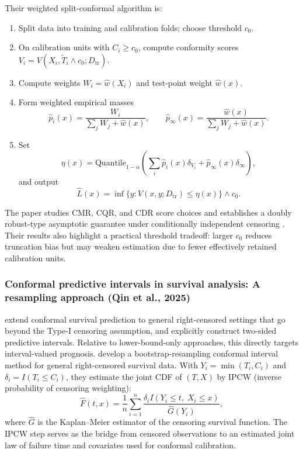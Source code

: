 \documentclass[12pt]{article}
\makeatletter
\let\thesis@subsection\subsubsection
\renewcommand{\subsection}{\thesis@subsection}
\makeatother
\begin{document}
Their weighted split-conformal algorithm is:
\begin{enumerate}
\item Split data into training and calibration folds; choose threshold $c_0$.
\item On calibration units with $C_i\ge c_0$, compute conformity scores $V_i=V(X_i,\widetilde T_i\wedge c_0;D_{\mathrm{tr}})$.
\item Compute weights $W_i=\widehat w(X_i)$ and test-point weight $\widehat w(x)$.
\item Form weighted empirical masses
\[
\widehat p_i(x)=\frac{W_i}{\sum_j W_j+\widehat w(x)},\qquad
\widehat p_\infty(x)=\frac{\widehat w(x)}{\sum_j W_j+\widehat w(x)}.
\]
\item Set
\[
\eta(x)=\mathrm{Quantile}_{1-\alpha}\!\left(\sum_i \widehat p_i(x)\delta_{V_i}+\widehat p_\infty(x)\delta_{\infty}\right),
\]
and output
\[
\widehat L(x)=\inf\{y:V(x,y;D_{\mathrm{tr}})\le \eta(x)\}\wedge c_0.
\]
\end{enumerate}
The paper studies CMR, CQR, and CDR score choices and establishes a doubly robust-type asymptotic guarantee under conditionally independent censoring \citep{candes2023conformalized}.
Their results also highlight a practical threshold tradeoff: larger $c_0$ reduces truncation bias but may weaken estimation due to fewer effectively retained calibration units.



\subsection{Conformal predictive intervals in survival analysis: A resampling approach (Qin et al., 2025)}
\citet{qin2025conformal} extend conformal survival prediction to general right-censored settings that go beyond the Type-I censoring assumption, and explicitly construct two-sided predictive intervals.
Relative to lower-bound-only approaches, this directly targets interval-valued prognosis.
\citet{qin2025conformal} develop a bootstrap-resampling conformal interval method for general right-censored survival data.
With $Y_i=\min(T_i,C_i)$ and $\delta_i=I(T_i\le C_i)$, they estimate the joint CDF of $(T,X)$ by IPCW (inverse probability of censoring weighting):
\[
\widehat F(t,x)=\frac{1}{n}\sum_{i=1}^n\frac{\delta_i I(Y_i\le t,\;X_i\le x)}{\widehat G(Y_i)},
\]
where $\widehat G$ is the Kaplan--Meier estimator of the censoring survival function.
The IPCW step serves as the bridge from censored observations to an estimated joint law of failure time and covariates used for conformal calibration. 
\end{document}
